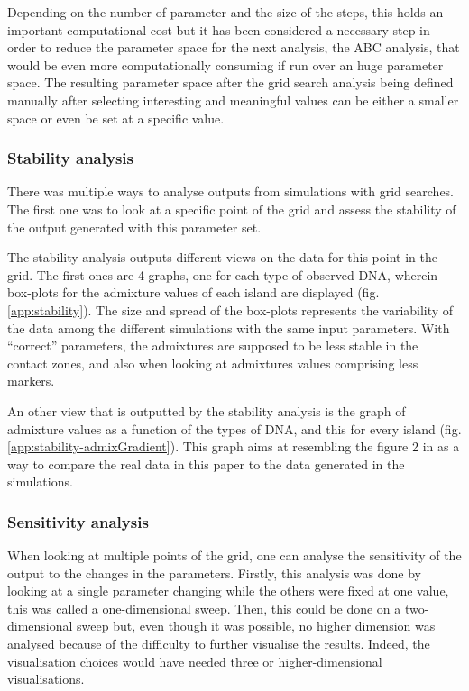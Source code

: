 \documentclass[a4paper,12pt]{report}
\begin{document}
Depending on the number of parameter and the size of the steps, this holds an important computational cost but it has been considered a necessary step in order to reduce the parameter space for the next analysis, the ABC analysis, that would be even more computationally consuming if run over an huge parameter space. The resulting parameter space after the grid search analysis being defined manually after selecting interesting and meaningful values can be either a smaller space or even be set at a specific value.

\subsubsection{Stability analysis}
There was multiple ways to analyse outputs from simulations with grid searches. The first one was to look at a specific point of the grid and assess the stability of the output generated with this parameter set.

The stability analysis outputs different views on the data for this point in the grid. The first ones are 4 graphs, one for each type of observed DNA, wherein box-plots for the admixture values of each island are displayed (fig. \ref{app:stability}). The size and spread of the box-plots represents the variability of the data among the different simulations with the same input parameters. With “correct” parameters, the admixtures are supposed to be less stable in the contact zones, and also when looking at admixtures values comprising less markers.

An other view that is outputted by the stability analysis is the graph of admixture values as a function of the types of DNA, and this for every island (fig. \ref{app:stability-admixGradient}). This graph aims at resembling the figure 2 in \cite{Lan01} as a way to compare the real data in this paper to the data generated in the simulations.


\subsubsection{Sensitivity analysis}
When looking at multiple points of the grid, one can analyse the sensitivity of the output to the changes in the parameters.
Firstly, this analysis was done by looking at a single parameter changing while the others were fixed at one value, this was called a one-dimensional sweep. Then, this could be done on a two-dimensional sweep but, even though it was possible, no higher dimension was analysed because of the difficulty to further visualise the results. Indeed, the visualisation choices would have needed three or higher-dimensional visualisations.
\end{document}

